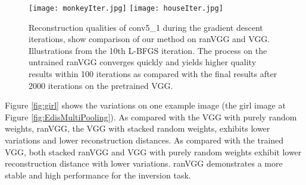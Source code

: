 \documentclass{article}
\begin{document}

\begin{figure}[htbp]
\centering
\texttt{[image: monkeyIter.jpg]}\hfill
\texttt{[image: houseIter.jpg]}
	\vspace{-0.5em}
\caption{Reconstruction qualities of conv5\_1 during the gradient descent iterations, show comparison of our method on ranVGG and VGG. Illustrations from the 10th L-BFGS iteration. The process on the untrained ranVGG converges quickly and yields higher quality results within 100 iterations as compared with the final results after 2000 iterations on the pretrained VGG.}
\label{Fig:EdisIteration}
\end{figure}


Figure \ref{fig:girl} shows the variations on one example image (the girl image at Figure \ref{fig:EdisMultiPooling}).
As compared with the VGG with purely random weights, ranVGG, the VGG with stacked random weights, exhibits lower variations and lower reconstruction distances.
As compared with the trained VGG, both stacked ranVGG and VGG with purely random weights exhibit lower reconstruction distance with lower variations.
ranVGG demonstrates a more stable and high performance for the inversion task.
\end{document}
